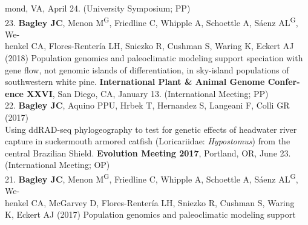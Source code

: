 \documentclass[margin,line]{res}
\begin{document}
\begin{resume}
\hspace*{8mm}mond, VA, April 24. (University Symposium; PP) \\
23. \textbf{Bagley JC}, Menon M\textsuperscript{G}, Friedline C, Whipple A, Schoettle A, S\'{a}enz AL\textsuperscript{G}, We-\\
\hspace*{8mm} henkel CA, Flores-Renter\'{i}a LH, Sniezko R, Cushman S, Waring K, Eckert AJ\\
\hspace*{8mm} (2018) Population genomics and paleoclimatic modeling support speciation with\\
\hspace*{8mm} gene flow, not genomic islands of differentiation, in sky-island populations of\\
\hspace*{8mm} southwestern white pine. \textbf{International Plant \& Animal Genome Confer-}\\ \vspace{2mm}
\hspace*{8mm}\textbf{ence XXVI}, San Diego, CA, January 13. (International Meeting; PP) \\
22. \textbf{Bagley JC}, Aquino PPU, Hrbek T, Hernandez S, Langeani F, Colli GR (2017)\\
\hspace*{8mm} Using ddRAD-seq phylogeography to test for genetic effects of headwater river\\
\hspace*{8mm} capture in suckermouth armored catfish (Loricariidae: \emph{Hypostomus}) from the\\
\hspace*{8mm} central Brazilian Shield. \textbf{Evolution Meeting 2017}, Portland, OR, June 23.\\ \vspace{2mm}
\hspace*{8mm}(International Meeting; OP) \\
21. \textbf{Bagley JC}, Menon M\textsuperscript{G}, Friedline C, Whipple A, Schoettle A, S\'{a}enz AL\textsuperscript{G}, We-\\
\hspace*{8mm} henkel CA, McGarvey D, Flores-Renter\'{i}a LH, Sniezko R, Cushman S, Waring\\
\hspace*{8mm} K, Eckert AJ (2017) Population genomics and paleoclimatic modeling support\\

\end{resume}
\end{document}
